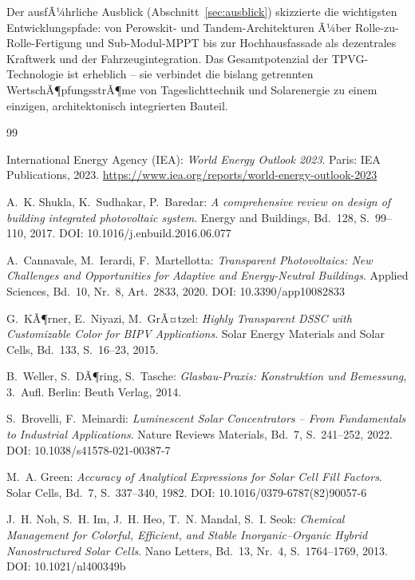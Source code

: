﻿\documentclass[a4paper,12pt]{article}
\theoremstyle{definition}
\theoremstyle{remark}
\begin{document}
Der ausfÃ¼hrliche Ausblick (Abschnitt~\ref{sec:ausblick}) skizzierte
die wichtigsten Entwicklungspfade: von Perowskit- und Tandem-Architekturen
Ã¼ber Rolle-zu-Rolle-Fertigung und Sub-Modul-MPPT bis zur Hochhausfassade
als dezentrales Kraftwerk und der Fahrzeugintegration. Das Gesamtpotenzial
der TPVG-Technologie ist erheblich -- sie verbindet die bislang getrennten
WertschÃ¶pfungsstrÃ¶me von Tageslichttechnik und Solarenergie zu einem
einzigen, architektonisch integrierten Bauteil.

\begin{thebibliography}{99}

International Energy Agency (IEA):
\textit{World Energy Outlook 2023}.
Paris: IEA Publications, 2023.
\url{https://www.iea.org/reports/world-energy-outlook-2023}

A.~K. Shukla, K.~Sudhakar, P.~Baredar:
\textit{A comprehensive review on design of building integrated photovoltaic system}.
Energy and Buildings, Bd.~128, S.~99--110, 2017.
DOI: 10.1016/j.enbuild.2016.06.077

A.~Cannavale, M.~Ierardi, F.~Martellotta:
\textit{Transparent Photovoltaics: New Challenges and Opportunities for Adaptive
and Energy-Neutral Buildings}.
Applied Sciences, Bd.~10, Nr.~8, Art.~2833, 2020.
DOI: 10.3390/app10082833

G.~KÃ¶rner, E.~Niyazi, M.~GrÃ¤tzel:
\textit{Highly Transparent DSSC with Customizable Color for
BIPV Applications}.
Solar Energy Materials and Solar Cells, Bd.~133, S.~16--23, 2015.

B.~Weller, S.~DÃ¶ring, S.~Tasche:
\textit{Glasbau-Praxis: Konstruktion und Bemessung}, 3.~Aufl.
Berlin: Beuth Verlag, 2014.

S.~Brovelli, F.~Meinardi:
\textit{Luminescent Solar Concentrators -- From Fundamentals to
Industrial Applications}.
Nature Reviews Materials, Bd.~7, S.~241--252, 2022.
DOI: 10.1038/s41578-021-00387-7

M.~A. Green:
\textit{Accuracy of Analytical Expressions for Solar Cell Fill Factors}.
Solar Cells, Bd.~7, S.~337--340, 1982.
DOI: 10.1016/0379-6787(82)90057-6

J.~H. Noh, S.~H. Im, J.~H. Heo, T.~N. Mandal, S.~I. Seok:
\textit{Chemical Management for Colorful, Efficient, and Stable
Inorganic--Organic Hybrid Nanostructured Solar Cells}.
Nano Letters, Bd.~13, Nr.~4, S.~1764--1769, 2013.
DOI: 10.1021/nl400349b


\end{thebibliography}
\end{document}
